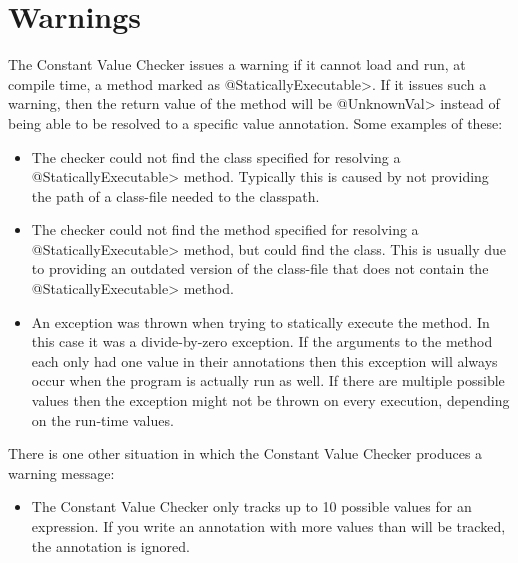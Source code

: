 \section{Warnings\label{value-checker-warnings}}

The Constant Value Checker issues a warning if it cannot load and run, at
compile time, a method marked as \<@StaticallyExecutable>.  If it issues
such a warning, then the return value of the method will be \<@UnknownVal>
instead of being able to be resolved to a specific value annotation.
Some examples of these:

\begin{itemize}
\item {}

  The checker could not find the class
  specified for resolving a \<@StaticallyExecutable> method. Typically
  this is caused by not providing the path of a class-file needed to
  the classpath.

\item {}

  The checker could not find the method  specified for
  resolving a \<@StaticallyExecutable> method, but could find the
  class. This is usually due to providing an outdated version of the
  class-file that does not contain the \<@StaticallyExecutable>
  method.

\item {}

  An exception was thrown when trying to statically execute the
  method. In this case it was a divide-by-zero exception. If the
  arguments to the method each only had one value in their annotations
  then this exception will always occur when the program is actually
  run as well. If there are multiple possible values then the exception
  might not be thrown on every execution, depending on the run-time values.

\end{itemize}

There is one other situation in which the Constant Value Checker produces a
warning message:

\begin{itemize}
\item {}

  The Constant Value Checker only tracks up to 10 possible values for an
  expression.  If you write an annotation with more values than will be
  tracked, the annotation is ignored.

\end{itemize}


